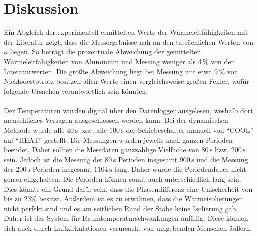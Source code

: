 %


\section{Diskussion}
\label{sec:Diskussion}

Ein Abgleich der experimentell ermittelten Werte der Wärmeleitfähigkeiten mit der Literatur zeigt, dass die Messergebnisse nah 
an den tatsächlichen Werten von $\kappa$ liegen. So beträgt die prozentuale Abweichung der gemittelten Wärmeleitfähigkeiten von 
Aluminium und Messing weniger als 4\,$\unit{\percent}$ von den Literaturwerten. Die größte Abweichung liegt bei Messung mit etwa
9\,$\unit{\percent}$ vor. Nichtsdestotrotz besitzen allen Werte einen vergleichsweise großen Fehler, wofür folgende Ursachen
verantwortlich sein könnten:\\\\

Der Temperaturen wurden digital über den Datenlogger ausgelesen, weshalb dort menschliches Versagen ausgeschlossen werden kann.
Bei der dynamischen Methode wurde alle $40\,\unit{\second}$ bzw. alle $100\,\unit{\second}$ der Schiebeschalter manuell
von \enquote{COOL} auf \enquote{HEAT} gestellt. Die Messungen wurden jeweils nach ganzen Perioden beendet. Daher sollten die 
Messdaten ganzzahlige Vielfache von $80\,\unit{\second}$ bzw. $200\,\unit{\second}$ sein. Jedoch ist die Messung der 
$80\,\unit{\second}$ Perioden insgesamt $900\,\unit{\second}$ und die Messung der $200\,\unit{\second}$ Perioden insgesamt 
$1104\,\unit{\second}$ lang.
Daher wurde die Periodendauer nicht genau eingehalten. Die Perioden können somit auch unterschiedlich lang sein.
Dies könnte ein Grund dafür sein, dass die Phasendifferenz eine Unischerheit von bis zu $23{\%}$ besitzt.
Außerdem ist es zu erwähnen, dass die Wärmeisolierungen nicht perfekt sind und es am seitlichen Rand der Stäbe keine
Isolierung gab. Daher ist das System für Raumtemperaturschwankungen anfällig. Diese können sich auch durch Luftzirkulationen 
verursacht von umgebenden Menschen äußern.

